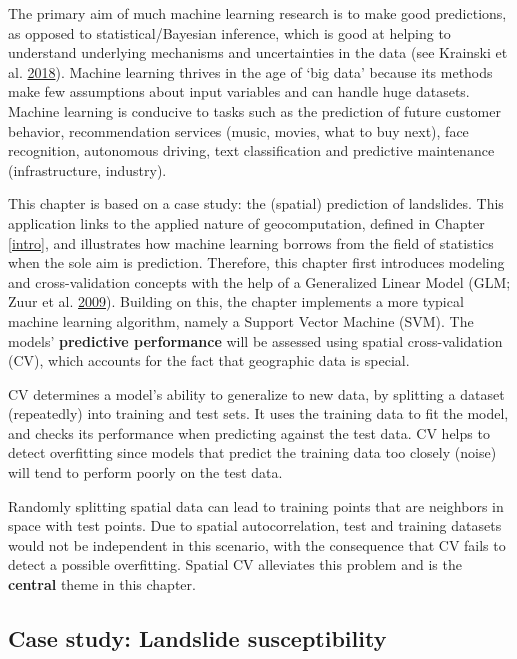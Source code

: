 \documentclass[]{krantz}
\begin{document}
The primary aim of much machine learning research is to make good predictions, as opposed to statistical/Bayesian inference, which is good at helping to understand underlying mechanisms and uncertainties in the data (see Krainski et al. \protect\hyperlink{ref-krainski_advanced_2018}{2018}).
Machine learning thrives in the age of `big data' because its methods make few assumptions about input variables and can handle huge datasets.
Machine learning is conducive to tasks such as the prediction of future customer behavior, recommendation services (music, movies, what to buy next), face recognition, autonomous driving, text classification and predictive maintenance (infrastructure, industry).

This chapter is based on a case study: the (spatial) prediction of landslides.
This application links to the applied nature of geocomputation, defined in Chapter \ref{intro}, and illustrates how machine learning borrows from the field of statistics when the sole aim is prediction.
Therefore, this chapter first introduces modeling and cross-validation concepts with the help of a Generalized Linear Model (GLM; Zuur et al. \protect\hyperlink{ref-zuur_mixed_2009}{2009}).
Building on this, the chapter implements a more typical machine learning algorithm, namely a Support Vector Machine (SVM).
The models' \textbf{predictive performance} will be assessed using spatial cross-validation (CV), which accounts for the fact that geographic data is special.

CV determines a model's ability to generalize to new data, by splitting a dataset (repeatedly) into training and test sets.
It uses the training data to fit the model, and checks its performance when predicting against the test data.
CV helps to detect overfitting since models that predict the training data too closely (noise) will tend to perform poorly on the test data.

Randomly splitting spatial data can lead to training points that are neighbors in space with test points.
Due to spatial autocorrelation, test and training datasets would not be independent in this scenario, with the consequence that CV fails to detect a possible overfitting.
Spatial CV alleviates this problem and is the \textbf{central} theme in this chapter.

\hypertarget{case-landslide}{%
\subsection{Case study: Landslide susceptibility}\label{case-landslide}}
\end{document}

